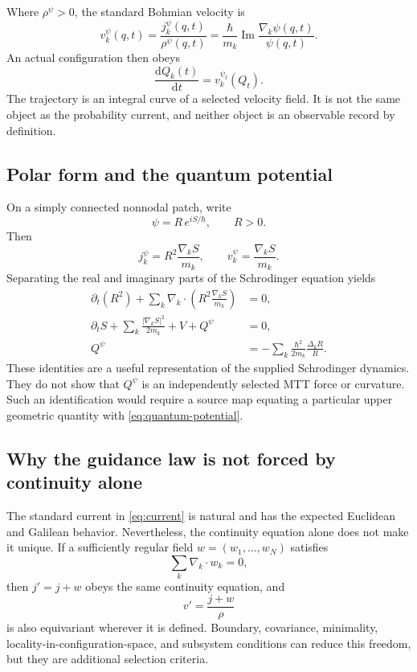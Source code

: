 \documentclass[11pt]{article}
\theoremstyle{definition}
\theoremstyle{remark}
\newcommand{\dd}{\mathrm d}
\begin{document}
Where \(\rho^\psi>0\), the standard Bohmian velocity is
\begin{equation}
v_k^\psi(q,t)
=
\frac{j_k^\psi(q,t)}{\rho^\psi(q,t)}
=
\frac{\hbar}{m_k}
\operatorname{Im}
\frac{\nabla_k\psi(q,t)}{\psi(q,t)}.
\label{eq:velocity}
\end{equation}
An actual configuration then obeys
\begin{equation}
\frac{\dd Q_k(t)}{\dd t}
=v_k^{\psi_t}(Q_t).
\label{eq:guidance}
\end{equation}
The trajectory is an integral curve of a selected velocity field.  It is
not the same object as the probability current, and neither object is an
observable record by definition.

\subsection{Polar form and the quantum potential}

On a simply connected nonnodal patch, write
\[
\psi=R\,e^{iS/\hbar},
\qquad R>0.
\]
Then
\[
j_k^\psi=R^2\frac{\nabla_kS}{m_k},
\qquad
v_k^\psi=\frac{\nabla_kS}{m_k}.
\]
Separating the real and imaginary parts of the Schrodinger equation yields
\begin{align}
\partial_t(R^2)
+\sum_k\nabla_k\!\cdot
\left(R^2\frac{\nabla_kS}{m_k}\right)&=0,
\label{eq:polar-continuity}\\
\partial_tS
+\sum_k\frac{|\nabla_kS|^2}{2m_k}
+V+Q^\psi&=0,
\label{eq:quantum-hj}\\
Q^\psi
&=
-\sum_k\frac{\hbar^2}{2m_k}\frac{\Delta_kR}{R}.
\label{eq:quantum-potential}
\end{align}
These identities are a useful representation of the supplied Schrodinger
dynamics.  They do not show that \(Q^\psi\) is an independently selected MTT
force or curvature.  Such an identification would require a source map
equating a particular upper geometric quantity with \cref{eq:quantum-potential}.

\subsection{Why the guidance law is not forced by continuity alone}
\label{sec:current-ambiguity}

The standard current in \cref{eq:current} is natural and has the expected
Euclidean and Galilean behavior.  Nevertheless, the continuity equation
alone does not make it unique.  If a sufficiently regular field
\(w=(w_1,\ldots,w_N)\) satisfies
\[
\sum_k\nabla_k\!\cdot w_k=0,
\]
then \(j'=j+w\) obeys the same continuity equation, and
\[
v'=\frac{j+w}{\rho}
\]
is also equivariant wherever it is defined.  Boundary, covariance,
minimality, locality-in-configuration-space, and subsystem conditions can
reduce this freedom, but they are additional selection criteria.
\end{document}
